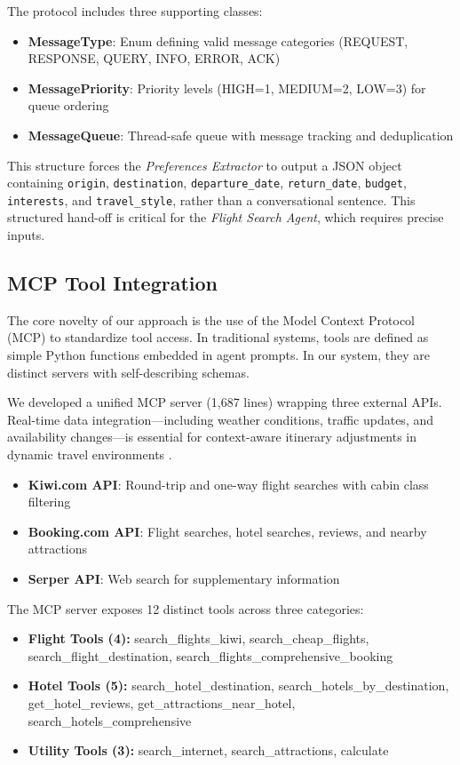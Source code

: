 \documentclass[conference]{IEEEtran}
\begin{document}
The protocol includes three supporting classes:
\begin{itemize}
    \item \textbf{MessageType}: Enum defining valid message categories (REQUEST, RESPONSE, QUERY, INFO, ERROR, ACK)
    \item \textbf{MessagePriority}: Priority levels (HIGH=1, MEDIUM=2, LOW=3) for queue ordering
    \item \textbf{MessageQueue}: Thread-safe queue with message tracking and deduplication
\end{itemize}

This structure forces the \textit{Preferences Extractor} to output a JSON object containing \texttt{origin}, \texttt{destination}, \texttt{departure\_date}, \texttt{return\_date}, \texttt{budget}, \texttt{interests}, and \texttt{travel\_style}, rather than a conversational sentence. This structured hand-off is critical for the \textit{Flight Search Agent}, which requires precise inputs.

\subsection{MCP Tool Integration}
The core novelty of our approach is the use of the Model Context Protocol (MCP) to standardize tool access. In traditional systems, tools are defined as simple Python functions embedded in agent prompts. In our system, they are distinct servers with self-describing schemas.

We developed a unified MCP server (1,687 lines) wrapping three external APIs. Real-time data integration---including weather conditions, traffic updates, and availability changes---is essential for context-aware itinerary adjustments in dynamic travel environments \cite{anitha2025intelligent, ravindra2025seamless}.

\begin{itemize}
    \item \textbf{Kiwi.com API}: Round-trip and one-way flight searches with cabin class filtering
    \item \textbf{Booking.com API}: Flight searches, hotel searches, reviews, and nearby attractions
    \item \textbf{Serper API}: Web search for supplementary information
\end{itemize}

The MCP server exposes 12 distinct tools across three categories:
\begin{itemize}
    \item \textbf{Flight Tools (4):} search\_flights\_kiwi, search\_cheap\_flights, search\_flight\_destination, search\_flights\_comprehensive\_booking
    \item \textbf{Hotel Tools (5):} search\_hotel\_destination, search\_hotels\_by\_destination, get\_hotel\_reviews, get\_attractions\_near\_hotel, search\_hotels\_comprehensive
    \item \textbf{Utility Tools (3):} search\_internet, search\_attractions, calculate
\end{itemize}
\end{document}
